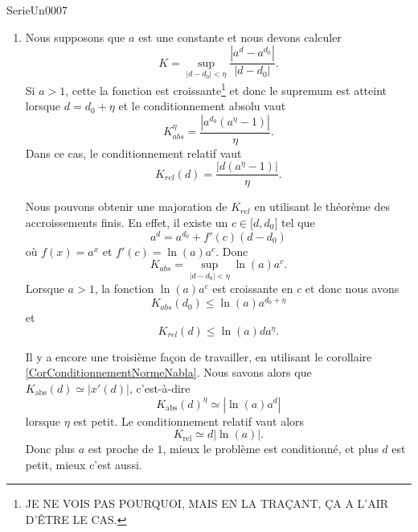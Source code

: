 
\begin{corrige}{SerieUn0007}

	\begin{enumerate}

		\item
			Nous supposons que $a$ est une constante et nous devons calculer
			\begin{equation}
				K=\sup_{| d-d_0 |<\eta}\frac{ | a^d-a^{d_0} | }{ | d-d_0 | }.
			\end{equation}
			Si $a>1$, cette la fonction est croissante\footnote{JE NE VOIS PAS POURQUOI, MAIS EN LA TRAÇANT, ÇA A L'AIR D'ÊTRE LE CAS.} et donc le supremum est atteint lorsque $d=d_0+\eta$ et le conditionnement absolu vaut
			\begin{equation}
				K_{abs}^{\eta}=\frac{ |a^{d_0}(a^{\eta}-1)| }{ \eta }.
			\end{equation}
			Dans ce cas, le conditionnement relatif vaut
			\begin{equation}
				K_{rel}(d)=\frac{ |d(a^{\eta}-1)| }{ \eta }.
			\end{equation}

			Nous pouvons obtenir une majoration de $K_{rel}$ en utilisant le théorème des accroissements finis. En effet, il existe un $c\in\mathopen[ d , d_0 \mathclose]$ tel que
			\begin{equation}
				a^d=a^{d_0}+f'(c)(d-d_0)
			\end{equation}
			où $f(x)=a^x$ et $f'(c)=\ln(a)a^c$. Donc
			\begin{equation}
				K_{abs}=\sup_{| d-d_0 |<\eta}\ln(a)a^c.
			\end{equation}
			Lorsque $a>1$, la fonction $\ln(a)a^c$ est croissante en $c$ et donc nous avons
			\begin{equation}
				K_{abs}(d_0)\leq \ln(a)a^{d_0+\eta}
			\end{equation}
			et
			\begin{equation}
				K_{rel}(d)\leq \ln(a)da^{\eta}.
			\end{equation}

			Il y a encore une troisième façon de travailler, en utilisant le corollaire \ref{CorConditionnementNormeNabla}. Nous savons alors que $K_{\text{abs}}(d)\simeq| x'(d) |$, c'est-à-dire
			\begin{equation}
				K_{\text{abs}}(d)^{\eta}\simeq| \ln(a)a^d |
			\end{equation}
			lorsque $\eta$ est petit. Le conditionnement relatif vaut alors
			\begin{equation}
				K_{\text{rel}}\simeq d| \ln(a) |.
			\end{equation}
			Donc plus $a$ est proche de $1$, mieux le problème est conditionné, et plus $d$ est petit, mieux c'est aussi.


\end{enumerate}
\end{corrige}
